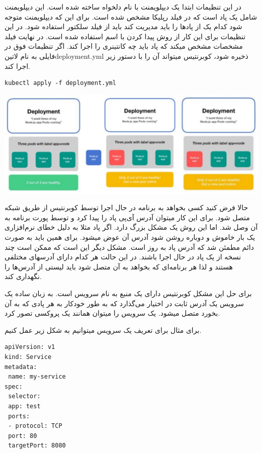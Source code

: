 \documentclass[a4]{report}
\begin{document}
در این تنظیمات ابتدا یک دیپلویمنت با نام دلخواه ساخته شده است. این دیپلویمنت شامل یک پاد است که در فیلد رپلیکا مشخص شده است. برای این که دیپلویمنت متوجه شود کدام یک از پادها را باید مدیریت کند باید از فیلد سلکتور
استفاده شود. در این تنظیمات برای این کار از روش پیدا کردن با اسم استفاده شده است. در نهایت فیلد مشخصات مشخص میکند که پاد باید چه کانتینری را اجرا کند.
اگر تنظیمات فوق در فایلی به نام ‌لاتین{deployment.yml} ذخیره شود، کوبرنتیس میتواند آن را با دستور
زیر اجرا کند.

\begin{latin}
\begin{verbatim}
kubectl apply -f deployment.yml
\end{verbatim}
\end{latin}

\includegraphics[scale=0.5]{fig/deploy}

حالا فرض کنید کسی بخواهد به برنامه در حال اجرا توسط کوبرنتیس از طریق شبکه متصل شود. برای این کار
میتوان آدرس آی‌پی پاد را پیدا کرد و توسط پورت برنامه به آن وصل شد. اما این روش یک مشکل بزرگ دارد. اگر پاد مثلا به دلیل خطای نرم‌افزاری یک بار خاموش و دوباره روشن شود آدرس آن عوض میشود. برای
همین باید به صورت دائم مطمئن شد که آدرس پاد به روز است. مشکل دیگر این است که ممکن است چند
نسخه از یک پاد در حال اجرا باشند. در این حالت هر کدام دارای آدرسهای مختلفی هستند و لذا هر برنامه‌ای
که بخواهد به آن متصل شود باید لیستی از آدرس‌ها را نگهداری کند.

برای حل این مشکل کوبرنتیس دارای یک منبع به نام سرویس است. به زبان ساده یک سرویس یک آدرس ثابت در اختیار می‌گذارد که به طور خودکار به هر پادی که به آن بخورد متصل میشود. یک سرویس را میتوان همانند یک پروکسی
 تصور کرد.

برای مثال برای تعریف یک سرویس میتوانیم به شکل زیر عمل کنیم.

\begin{latin}
\begin{verbatim}
apiVersion: v1
kind: Service
metadata:
 name: my-service
spec:
 selector:
 app: test
 ports:
 - protocol: TCP
 port: 80
 targetPort: 8080
\end{verbatim}
\end{latin}
\end{document}
